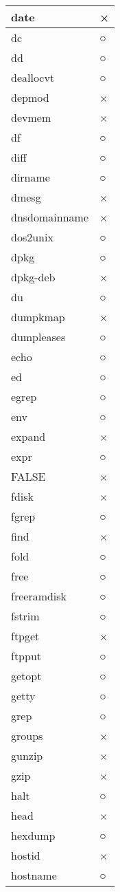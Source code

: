 \begin{longtable}{lp{50mm}}
date & × \\ \hline
dc & ○ \\ \hline
dd & ○ \\ \hline
deallocvt & ○ \\ \hline
depmod & × \\ \hline
devmem & × \\ \hline
df & ○ \\ \hline
diff & ○ \\ \hline
dirname & ○ \\ \hline
dmesg & × \\ \hline
dnsdomainname & × \\ \hline
dos2unix & ○ \\ \hline
dpkg & ○ \\ \hline
dpkg-deb & × \\ \hline
du & ○ \\ \hline
dumpkmap & × \\ \hline
dumpleases & ○ \\ \hline
echo & ○ \\ \hline
ed & ○ \\ \hline
egrep & ○ \\ \hline
env & ○ \\ \hline
expand & × \\ \hline
expr & ○ \\ \hline
FALSE & × \\ \hline
fdisk & × \\ \hline
fgrep & ○ \\ \hline
find & × \\ \hline
fold & ○ \\ \hline
free & ○ \\ \hline
freeramdisk & ○ \\ \hline
fstrim & ○ \\ \hline
ftpget & × \\ \hline
ftpput & ○ \\ \hline
getopt & ○ \\ \hline
getty & ○ \\ \hline
grep & ○ \\ \hline
groups & × \\ \hline
gunzip & × \\ \hline
gzip & × \\ \hline
halt & ○ \\ \hline
head & × \\ \hline
hexdump & ○ \\ \hline
hostid & × \\ \hline
hostname & ○ \\ \hline

\end{longtable}
